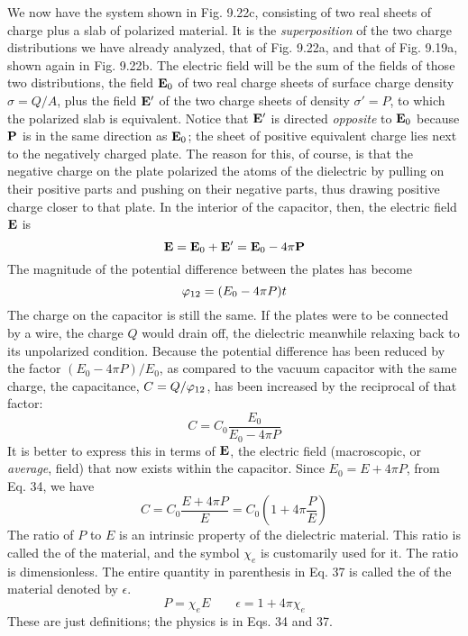 We now have the system shown in Fig. 9.22c, consisting of two real
sheets of charge plus a slab of polarized material. It is the \emph{superposition}
of the two charge distributions we have already analyzed,
that of Fig. 9.22a, and that of Fig. 9.19a, shown again in Fig. 9.22b.
The electric field will be the sum of the fields of those two 
distributions, the field $\mathbf{E}_0$ of two real charge sheets of surface charge density
$\sigma = Q/A$, plus the field $\mathbf{E}'$ of the two charge sheets of density $\sigma' = P$,
to which the polarized slab is equivalent. Notice that $\mathbf{E}'$ is directed
\emph{opposite} to $\mathbf{E}_0$ because $\mathbf{P}$ is in the same direction as $\mathbf{E}_0$; the sheet of
positive equivalent charge lies next to the negatively charged plate.
The reason for this, of course, is that the negative charge on the plate
polarized the atoms of the dielectric by pulling on their positive parts
and pushing on their negative parts, thus drawing positive charge
closer to that plate. In the interior of the capacitor, then, the electric
field $\mathbf{E}$ is
\begin{equation}
  \mathbf{E} = \mathbf{E}_0+\mathbf{E}' = \mathbf{E}_0-4\pi\mathbf{P}
\end{equation}
The magnitude of the potential difference between the plates has
become
\begin{equation}
  \varphi_{12} = (E_0-4\pi P)t
\end{equation}
The charge on the capacitor is still the same. If the plates were to
be connected by a wire, the charge $Q$ would drain off, the dielectric
meanwhile relaxing back to its unpolarized condition. Because the
potential difference has been reduced by the factor $(E_0-4\pi P)/E_0$,
as compared to the vacuum capacitor with the same charge, the
capacitance, $C = Q/\varphi_{12}$, has been increased by the reciprocal of that
factor:
\begin{equation}
  C = C_0\frac{E_0}{E_0-4\pi P}
\end{equation}
It is better to express this in terms of $\mathbf{E}$, the electric field (macroscopic,
or \emph{average}, field) that now exists within the capacitor. Since
$E_0 = E + 4\pi P$, from Eq. 34, we have
\begin{equation}
  C = C_0 \frac{E+4\pi P}{E} = C_0\left(1+4\pi\frac{P}{E}\right)
\end{equation}
The ratio of $P$ to $E$ is an intrinsic property of the dielectric material.
This ratio is called the  of the material, and the
symbol $\chi_e$ is customarily used for it. The ratio is dimensionless.
The entire quantity in parenthesis in Eq. 37 is called the  of the material denoted by $\epsilon$.
\begin{equation}
  P = \chi_e E \qquad \epsilon=1+4\pi\chi_e
\end{equation}
These are just definitions; the physics is in Eqs. 34 and 37.

